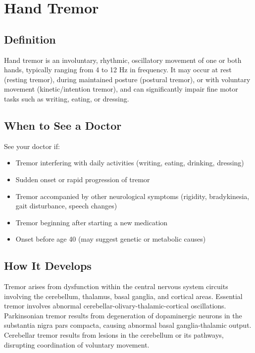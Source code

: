 \chapter{Hand Tremor}

\section*{Definition}
Hand tremor is an involuntary, rhythmic, oscillatory movement of one or both hands, typically ranging from 4 to 12 Hz in frequency. It may occur at rest (resting tremor), during maintained posture (postural tremor), or with voluntary movement (kinetic/intention tremor), and can significantly impair fine motor tasks such as writing, eating, or dressing.

\section*{When to See a Doctor}
See your doctor if:
\begin{itemize}
  \item Tremor interfering with daily activities (writing, eating, drinking, dressing)
  \item Sudden onset or rapid progression of tremor
  \item Tremor accompanied by other neurological symptoms (rigidity, bradykinesia, gait disturbance, speech changes)
  \item Tremor beginning after starting a new medication
  \item Onset before age 40 (may suggest genetic or metabolic causes)
\end{itemize}

\section*{How It Develops}
Tremor arises from dysfunction within the central nervous system circuits involving the cerebellum, thalamus, basal ganglia, and cortical areas. Essential tremor involves abnormal cerebellar-olivary-thalamic-cortical oscillations. Parkinsonian tremor results from degeneration of dopaminergic neurons in the substantia nigra pars compacta, causing abnormal basal ganglia-thalamic output. Cerebellar tremor results from lesions in the cerebellum or its pathways, disrupting coordination of voluntary movement.

